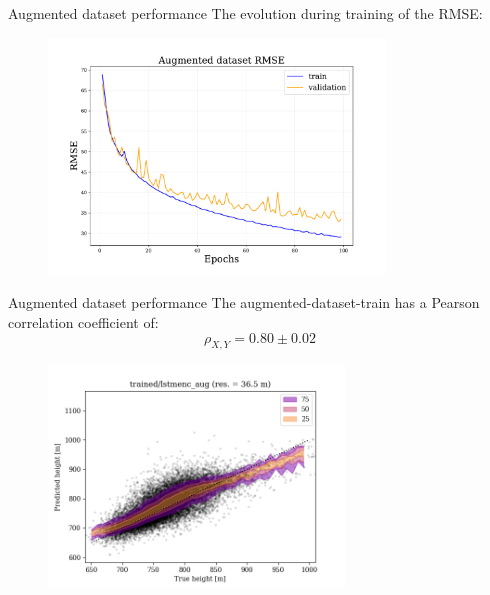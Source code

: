 \documentclass{beamer}
\begin{document}
\begin{frame}{Augmented dataset performance}
    The evolution during training of the RMSE:


        \begin{figure}
            \centering
            \includegraphics[width=0.8\textwidth]{figures/lstmenc_aug_rmse.pdf}
        \end{figure}

\end{frame}

\begin{frame}{Augmented dataset performance}
    The augmented-dataset-train has a Pearson correlation coefficient of:
    \begin{equation*}
        \rho_{X,Y} = 0.80 \pm 0.02
    \end{equation*}

        \begin{figure}
            \centering
            \includegraphics[width=0.7\textwidth]{figures/augmented_train.png}
        \end{figure}

\end{frame}
\end{document}
